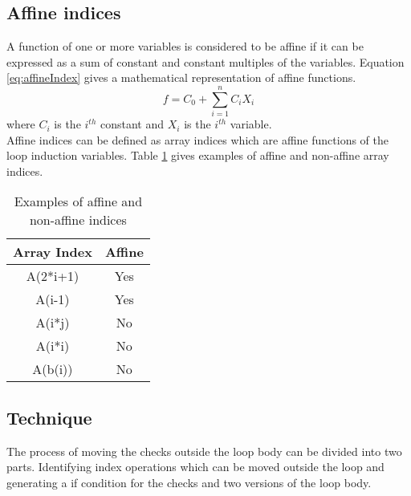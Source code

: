 \subsection{Affine indices}
A function of one or more variables is considered to be affine if it can be expressed as a sum of constant and constant multiples of the variables. Equation \ref{eq:affineIndex} gives a mathematical representation of affine functions. 
\begin{equation}
\label{eq:affineIndex}
f = C_0 + \sum\limits_{i=1}^n C_iX_i 
\end{equation}
where $C_i$ is the $i^{th}$ constant and $X_i$ is the $i^{th}$ variable.  \\
Affine indices can be defined as array indices which are affine functions of the loop induction variables. Table \ref{tab:affineIndex} gives examples of affine and non-affine array indices. 
\begin{table}[htbp]
\centering
\begin{tabular}{|c|c|}
\hline
Array Index & Affine \\ \hline
A(2*i+1)    & Yes    \\ \hline
A(i-1)    & Yes    \\ \hline
A(i*j)      & No    \\ \hline
A(i*i)      & No     \\ \hline
A(b(i))     & No     \\ \hline
\end{tabular}
\caption{Examples of affine and non-affine indices}
\label{tab:affineIndex}
\end{table}
\subsection{Technique}
The process of moving the checks outside the loop body can be divided into two parts. Identifying index operations which can be moved outside the loop and generating a if condition for the checks and two versions of the loop body.   
